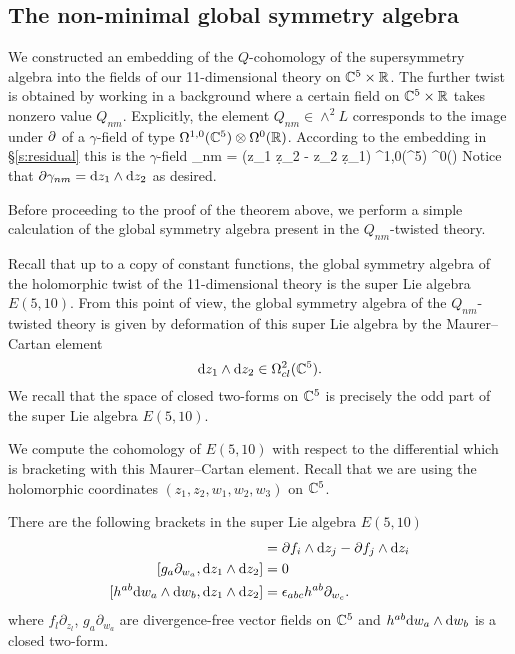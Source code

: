 
%

\subsection{The non-minimal global symmetry algebra}

We constructed an embedding of the $Q$-cohomology of the supersymmetry algebra into the fields of our 11-dimensional theory on $\mathbb C^5 \times \mathbb R$. 
The further twist is obtained by working in a background where a certain field on $\mathbb C^5 \times \mathbb R$ takes nonzero value $Q_{nm}$. 
Explicitly, the element $Q_{nm} \in \wedge^2 L$ corresponds to the image under $\partial$ of a $\gamma$-field of type $\Omega^{1,0}(\mathbb C^5) \otimes \Omega^0(\mathbb R)$. 
According to the embedding in \S \ref{s:residual} this is the $\gamma$-field 
\beqn\label{eqn:gammanm}
\gamma_{nm} =  (z_1 \d z_2 - z_2 \d z_1) \in \Omega^{1,0}(\CC^5) \otimes \Omega^0(\RR) 
\eeqn
Notice that $\partial \gamma_{nm} = {\rm d} z_1 \wedge {\rm d} z_2$ as desired.

Before proceeding to the proof of the theorem above, we perform a simple calculation of the global symmetry algebra present in the $Q_{nm}$-twisted theory. 

Recall that up to a copy of constant functions, the global symmetry algebra of the holomorphic twist of the 11-dimensional theory is the super Lie algebra $E(5,10)$.
From this point of view, the global symmetry algebra of the $Q_{nm}$-twisted theory is given by deformation of this super Lie algebra by the Maurer--Cartan element 
\[
{\rm d} z_1 \wedge {\rm d} z_2 \in \Omega^{2}_{cl}(\mathbb C^5) .
\]
We recall that the space of closed two-forms on $\mathbb C^5$ is precisely the odd part of the super Lie algebra $E(5,10)$. 

We compute the cohomology of $E(5,10)$ with respect to the differential which is bracketing with this Maurer--Cartan element. 
Recall that we are using the holomorphic coordinates $(z_1,z_2,w_1,w_2,w_3)$ on $\mathbb C^5$. 

There are the following brackets in the super Lie algebra $E(5,10)$ 
\begin{align*}
[f_l \partial_{z_l} , \d z_1 \wedge \d z_2] & = \del f_i \wedge \d z_j - \del f_j \wedge \d z_i \\
[g_a \partial_{w_a} , \d z_1 \wedge \d z_2] & = 0 \\
[h^{ab} \d w_a \wedge \d w_b , \d z_1 \wedge \d z_2 ] & = \ep_{abc} h^{ab} \partial_{w_c} .
\end{align*}
where $f_l \partial_{z_l}$, $g_a \partial_{w_a}$ are divergence-free vector fields on $\mathbb C^5$ and $h^{ab} {\rm d} w_a \wedge {\rm d} w_b$ is a closed two-form. 

